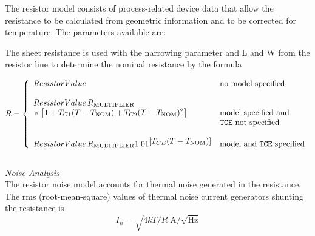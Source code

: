 \label{RESmodelpspice}
The resistor model consists of  process-related  device
data  that  allow  the  resistance  to  be  calculated  from
geometric information and to be corrected  for  temperature.
The parameters available are:



The sheet resistance is used with the narrowing parameter and L and W from the
resistor line to determine the nominal resistance by the formula

\begin{equation}
R = \left\{ \begin{array}{ll}
   ResistorValue & \mbox{no model specified}\\ \\
   ResistorValue \,R_{\ms{MULTIPLIER}} \\
   \times \left[ 1 + T_{C1} (T - T_{\ms{{NOM}}}) + T_{C2}(T-T_{\ms{NOM}})^2 \right]
		    & \mbox{model specified and}\\
		    & \mbox{{\tt TCE} not specified}\\ \\
   ResistorValue\,R_{\ms{MULTIPLIER}} 1.01^{\textstyle [T_{CE} (T - T_{\ms{{NOM}}})]}
		    & \mbox{model and {\tt TCE} specified}
    \end{array} \right. %
\end{equation}\\[0.2in]

\clearpage
\noindent\underline{\sl \large Noise Analysis}\\[0.1in]
The resistor noise model accounts for thermal noise generated in the resistance.
The rms (root-mean-square) values of
thermal noise current generators shunting the resistance is
\begin{equation}
I_n = \sqrt{4kT/R}~\mbox{A/}\sqrt{\mbox{Hz}}
\end{equation}
